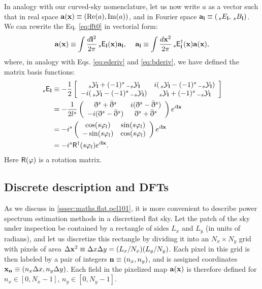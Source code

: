 \documentclass[usenatbib]{mnrasb}
\begin{document}
      In analogy with our curved-sky nomenclature, let us now write $a$ as a vector such that in real space ${\bf a}({\bf x})\equiv({\rm Re}(a),{\rm Im}(a))$, and in Fourier space ${\bf a}_{\bf l}\equiv(\,_sE_{\bf l},\,_sB_{\bf l})$. We can rewrite the Eq. \ref{eq:fft0} in vectorial form:
      \begin{equation}
        {\bf a}({\bf x})\equiv\int\frac{d{\bf l}^2}{2\pi}\,_s{\sf E}_{\bf l}({\bf x}){\bf a}_{\bf l},\hspace{12pt}{\bf a}_{\bf l}\equiv\int\frac{d{\bf x}^2}{2\pi}\,_s{\sf E}^\dag_{\bf l}({\bf x}){\bf a}({\bf x}),
      \end{equation}
      where, in analogy with Eqs. \ref{eq:ederiv} and \ref{eq:bderiv},  we have defined the matrix basis functions:
      \begin{align}\nonumber
        \,_s{\sf E}_{\bf l}
        &\equiv-\frac{1}{2}
        \left[\begin{array}{cc}
                 \,_s{\cal Y}_{\bf l}+(-1)^s\,_{-s}{\cal Y}_{\bf l}  & i(\,_s{\cal Y}_{\bf l}-(-1)^s\,_{-s}{\cal Y}_{\bf l}) \\
              -i(\,_s{\cal Y}_{\bf l}-(-1)^s\,_{-s}{\cal Y}_{\bf l}) &   \,_s{\cal Y}_{\bf l}+(-1)^s\,_{-s}{\cal Y}_{\bf l}
            \end{array}\right]\\\nonumber
        &=-\frac{1}{2l^s}
        \left(\begin{array}{cc}
                 \eth^s+\bar{\eth}^s & i(\eth^s-\bar{\eth}^s) \\
              -i(\eth^s-\bar{\eth}^s) &  \eth^s+\bar{\eth}^s
            \end{array}\right)e^{i{\bf l}{\bf x}}\\\nonumber
        &=-i^s
        \left(\begin{array}{cc}
               \cos(s\varphi_l) & \sin(s\varphi_l) \\
              -\sin(s\varphi_l) & \cos(s\varphi_l)
            \end{array}\right)e^{i{\bf l}{\bf x}}\\\label{eq:flat_sht}
        &=-i^s{\sf R}^\dag(s\varphi_l)e^{i{\bf l}{\bf x}}.
      \end{align}
      Here ${\sf R}(\varphi)$ is a rotation matrix.
    
    \subsection{Discrete description and DFTs}\label{app:flat.dft}
      As we discuss in \ref{sssec:maths.flat.pcl101}, it is more convenient to describe power spectrum estimation methods in a discretized flat sky. Let the patch of the sky under inspection be contained by a rectangle of sides $L_x$ and $L_y$ (in units of radians), and let us discretize this rectangle by dividing it into an $N_x\times N_y$ grid with pixels of area $\Delta{\bf x}^2\equiv\Delta x\Delta y=(L_x/N_x)(L_y/N_y)$. Each pixel in this grid is then labeled by a pair of integers ${\bf n}\equiv(n_x,n_y)$, and is assigned coordinates ${\bf x}_{\bf n}\equiv(n_x\Delta x,n_y\Delta y)$. Each field in the pixelized map ${\bf a}({\bf x})$ is therefore defined for $n_x\in[0,N_x-1]$, $n_y\in[0,N_y-1]$.
    
\end{document}
